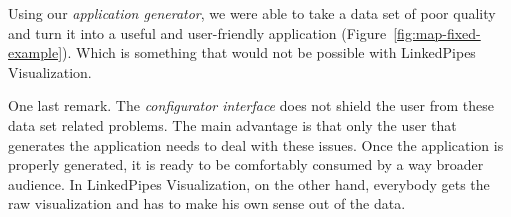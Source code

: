 Using our \emph{application generator}, we were able to take a data set of poor quality and turn it into a useful and user-friendly application (Figure~\ref{fig:map-fixed-example}). Which is something that would not be possible with LinkedPipes Visualization.

One last remark. The \emph{configurator interface} does not shield the user from these data set related problems. The main advantage is that only the user that generates the application needs to deal with these issues. Once the application is properly generated, it is ready to be comfortably consumed by a way broader audience. In LinkedPipes Visualization, on the other hand, everybody gets the raw visualization and has to make his own sense out of the data.
